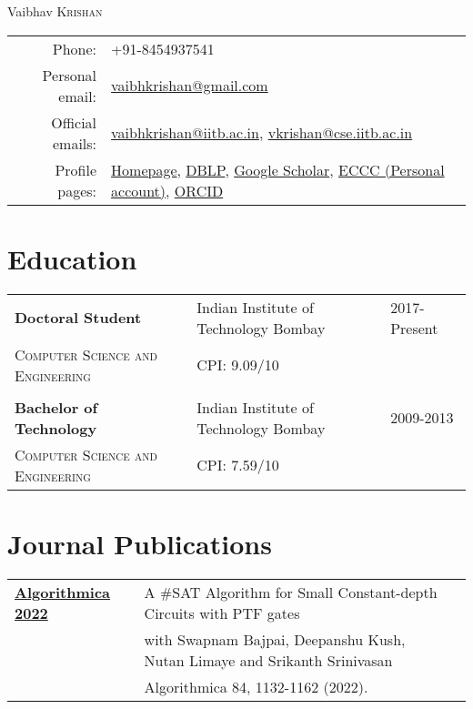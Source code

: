 \documentclass[a4paper,10pt]{article}
\begin{document}
\par{\centering
{\Huge Vaibhav \textsc{Krishan}
}\bigskip\par}

\begin{tabular}{rl}
  Phone: & +91-8454937541 \\
  Personal email: & \href{mailto:vaibhkrishan@gmail.com}{vaibhkrishan@gmail.com} \\ 
  Official emails: & \href{mailto:vaibhkrishan@iitb.ac.in}{vaibhkrishan@iitb.ac.in}, \href{mailto:vkrishan@cse.iitb.ac.in}{vkrishan@cse.iitb.ac.in} \\
  Profile pages: & \href{https://vaibhkrishan.github.io}{Homepage}, 
  \href{https://dblp.org/pid/187/8296.html}{DBLP},
  \href{https://scholar.google.com/citations?user=dVMC44EAAAAJ&hl=en}{Google Scholar},
  \href{https://eccc.weizmann.ac.il/author/1412/">ECCC (IIT Bombay account)</a>, <a href="https://eccc.weizmann.ac.il/author/985/}{ECCC (Personal account)},
  \href{https://orcid.org/0009-0000-0335-1963}{ORCID}
\end{tabular}

\section{Education}

\begin{tabular}{lll}
  {\bf Doctoral Student} & Indian Institute of Technology Bombay & 2017-Present \\
  \textsc{Computer Science and Engineering} & CPI: 9.09/10 & \\
  \\
  {\bf Bachelor of Technology} & Indian Institute of Technology Bombay & 2009-2013 \\
  \textsc{Computer Science and Engineering} & CPI: 7.59/10 &
\end{tabular}

\section{Journal Publications}

\begin{tabular}{p{2.5cm}|p{11cm}l}
  \href{https://link.springer.com/article/10.1007/s00453-021-00915-7}{{\bf Algorithmica 2022}} & A \#SAT Algorithm for Small Constant-depth Circuits with PTF gates \\
  & with Swapnam Bajpai, Deepanshu Kush, Nutan Limaye and Srikanth Srinivasan \\
  & Algorithmica 84, 1132-1162 (2022).
\end{tabular}
\end{document}
